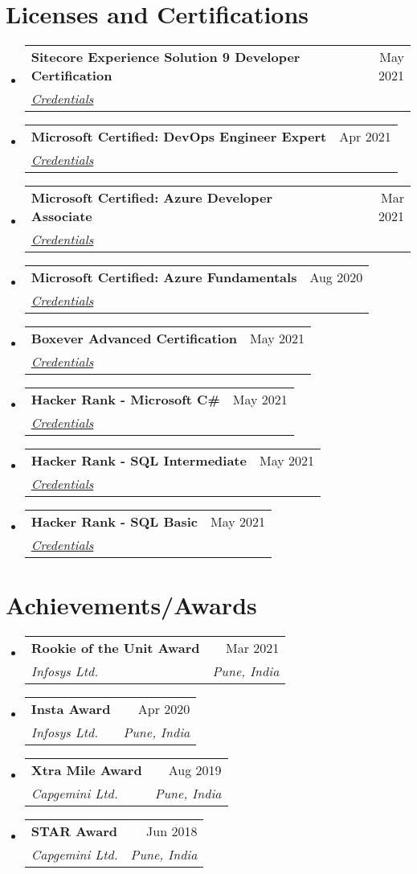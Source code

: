 \documentclass[letterpaper,11pt]{article}
\makeatletter
\newcommand{\resumeSubheading}[4]{
  \vspace{-2pt}\item
    \begin{tabular*}{0.97\textwidth}[t]{l@{\extracolsep{\fill}}r}
      \textbf{#1} & #2 \\
      \textit{\small#3} & \textit{\small #4} \\
    \end{tabular*}\vspace{-7pt}
}
\newcommand{\resumeSubHeadingListStart}{\begin{itemize}[leftmargin=0.15in, label={}]}
\newcommand{\resumeSubHeadingListEnd}{\end{itemize}}
\makeatother
\begin{document}
\section{Licenses and Certifications}
    \resumeSubHeadingListStart
    \resumeSubheading
      {Sitecore Experience Solution 9 Developer Certification}{May 2021}{\href{https://learning.sitecore.com/award/certification/d64b5497-4788-3b2b-b4c0-71ac204ef6ec/view-ext}{Credentials}}{}
      \resumeSubheading
      {Microsoft Certified: DevOps Engineer Expert}{ Apr 2021}{\href{https://www.credly.com/badges/43461714-5924-4ce1-b231-e742ec9b5718?source=linked_in_profile}{Credentials}}{}
      \resumeSubheading
      {Microsoft Certified: Azure Developer Associate}{Mar 2021}{\href{https://www.youracclaim.com/badges/d1518a31-e072-4c2c-80e4-267ffba95cb1?source=linked_in_profile}{Credentials}}{}
      \resumeSubheading
      {Microsoft Certified: Azure Fundamentals}{Aug 2020}{\href{https://www.youracclaim.com/badges/cb62695b-9303-4210-b261-affc58a5d4d4?source=linked_in_profile}{Credentials}}{}
      \resumeSubheading
      {Boxever Advanced Certification}{May 2021}{\href{https://learning.sitecore.com/award/certification/5dcb1058-4c92-3a99-aced-4610f1f0b6f9/view-ext}{Credentials}}{}
      \resumeSubheading
      {Hacker Rank - Microsoft C\#}{May 2021}{\href{https://www.hackerrank.com/certificates/740550f472b6}{Credentials}}{}
      \resumeSubheading
      {Hacker Rank - SQL Intermediate}{May 2021}{\href{https://www.hackerrank.com/certificates/e019de9ae6a9}{Credentials}}{}
      \resumeSubheading
      {Hacker Rank - SQL Basic}{May 2021}{\href{https://www.hackerrank.com/certificates/a83e36150dbf}{Credentials}}{}
  \resumeSubHeadingListEnd

 
 \section{Achievements/Awards}
    \resumeSubHeadingListStart
    \resumeSubheading
      {Rookie of the Unit Award}{Mar 2021}{Infosys Ltd.}{Pune, India}
      \resumeSubheading
      {Insta Award}{Apr 2020}{Infosys Ltd.}{Pune, India}
      \resumeSubheading
      {Xtra Mile Award}{Aug 2019}{Capgemini Ltd.}{Pune, India}
      \resumeSubheading
      {STAR Award}{Jun 2018}{Capgemini Ltd.}{Pune, India}
  \resumeSubHeadingListEnd
  






\end{document}
